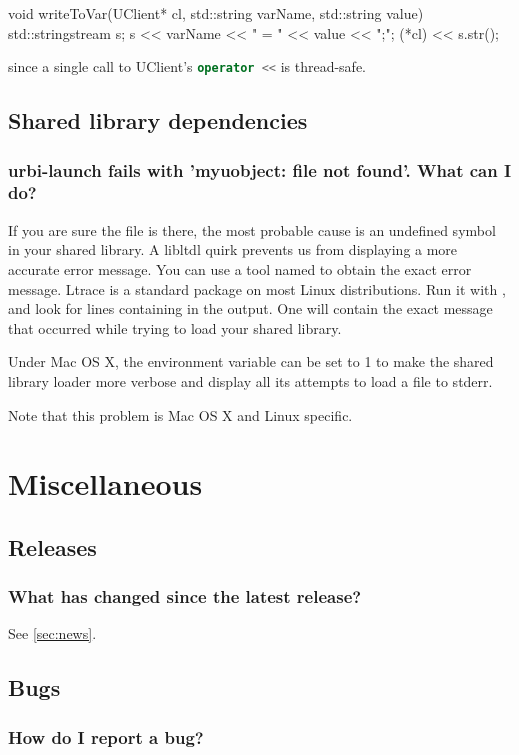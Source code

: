 \begin{cxx}
void
writeToVar(UClient* cl, std::string varName, std::string value)
{
  std::stringstream s;
  s << varName << " = " << value << ";";
  (*cl) << s.str();
}
\end{cxx}

\noindent
since a single call to UClient's \lstinline[language=C++]|operator <<|
is thread-safe.


\subsection{Shared library dependencies}
\subsubsection{urbi-launch fails with 'myuobject: file not found'. What can I do?}
If you are sure the file is there, the most probable cause is an
undefined symbol in your shared library. A libltdl quirk prevents us
from displaying a more accurate error message.  You can use a tool
named  to obtain the exact error message.  Ltrace is a
standard package on most Linux distributions.  Run it with
, and look for lines
containing  in the output. One will contain the exact
message that occurred while trying to load your shared library.

Under Mac OS X, the  environment variable can
be set to 1 to make the shared library loader more verbose and display
all its attempts to load a file to stderr.

Note that this problem is Mac OS X and Linux specific.

\section{Miscellaneous}
\subsection{Releases}
\subsubsection{What has changed since the latest release?}
See \autoref{sec:news}.

\subsection{Bugs}
\subsubsection{How do I report a bug?}

